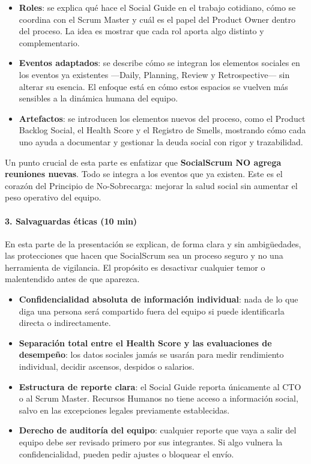 \begin{itemize}
    \item \textbf{Roles}: se explica qué hace el Social Guide en el trabajo cotidiano, cómo se coordina con el Scrum Master y cuál es el papel del Product Owner dentro del proceso. La idea es mostrar que cada rol aporta algo distinto y complementario.

    \item \textbf{Eventos adaptados}: se describe cómo se integran los elementos sociales en los eventos ya existentes —Daily, Planning, Review y Retrospective— sin alterar su esencia. El enfoque está en cómo estos espacios se vuelven más sensibles a la dinámica humana del equipo.

    \item \textbf{Artefactos}: se introducen los elementos nuevos del proceso, como el Product Backlog Social, el Health Score y el Registro de Smells, mostrando cómo cada uno ayuda a documentar y gestionar la deuda social con rigor y trazabilidad.
\end{itemize}

Un punto crucial de esta parte es enfatizar que \textbf{SocialScrum NO agrega reuniones nuevas}. Todo se integra a los eventos que ya existen. Este es el corazón del Principio de No-Sobrecarga: mejorar la salud social sin aumentar el peso operativo del equipo.

\paragraph{3. Salvaguardas éticas (10 min)}

En esta parte de la presentación se explican, de forma clara y sin ambigüedades, las protecciones que hacen que SocialScrum sea un proceso seguro y no una herramienta de vigilancia. El propósito es desactivar cualquier temor o malentendido antes de que aparezca.

\begin{itemize}
    \item \textbf{Confidencialidad absoluta de información individual}: nada de lo que diga una persona será compartido fuera del equipo si puede identificarla directa o indirectamente.

    \item \textbf{Separación total entre el Health Score y las evaluaciones de desempeño}: los datos sociales jamás se usarán para medir rendimiento individual, decidir ascensos, despidos o salarios.

    \item \textbf{Estructura de reporte clara}: el Social Guide reporta únicamente al CTO o al Scrum Master.
          Recursos Humanos no tiene acceso a información social, salvo en las excepciones legales previamente establecidas.

    \item \textbf{Derecho de auditoría del equipo}: cualquier reporte que vaya a salir del equipo debe ser revisado primero por sus integrantes. Si algo vulnera la confidencialidad, pueden pedir ajustes o bloquear el envío.
\end{itemize}


